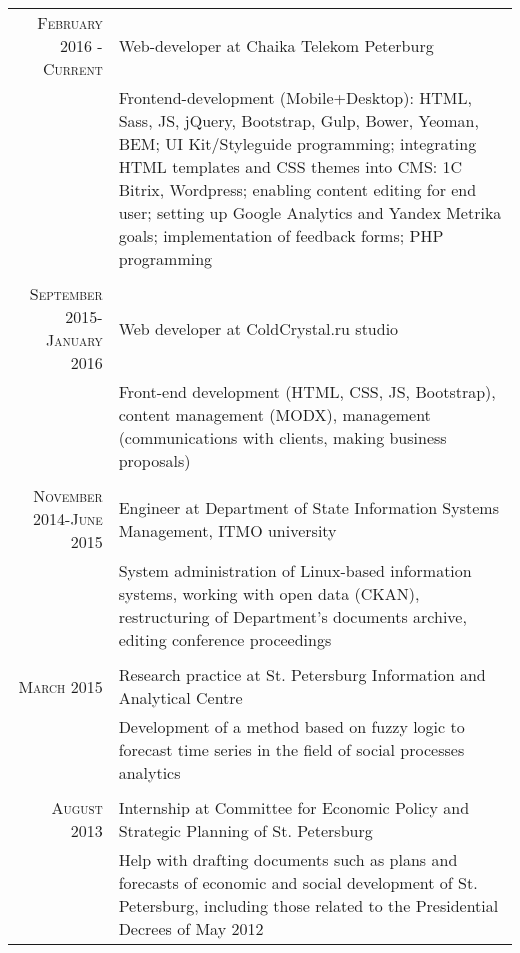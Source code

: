 \documentclass[a4paper,10pt]{article} %
\begin{document}
\begin{tabular}{r|p{11cm}}
    \textsc{February 2016 - Current} & Web-developer at Chaika Telekom Peterburg\\
    & \footnotesize{Frontend-development (Mobile+Desktop): HTML, Sass, JS, jQuery,
        Bootstrap, Gulp, Bower, Yeoman, BEM; UI Kit/Styleguide programming; 
        integrating HTML templates and CSS themes \protect\linebreak into CMS: 1C Bitrix, Wordpress; 
        enabling content editing for end user; setting up Google Analytics and
        Yandex Metrika goals; implementation of feedback forms; PHP programming}\\
\multicolumn{2}{c}{} \\
    \textsc{September 2015-January 2016} & Web developer at ColdCrystal.ru studio \\
    & \footnotesize{Front-end development (HTML, CSS, JS, Bootstrap), content
management (MODX), management (communications with clients, making business
proposals)}\\
\multicolumn{2}{c}{} \\
    \textsc{November 2014-June 2015} & Engineer at Department of State
Information Systems Management, \protect\linebreak ITMO university \\
    & \footnotesize{System administration of Linux-based information systems,
        working with open data (CKAN), restructuring of Department's documents archive,
        editing conference proceedings}\\
\multicolumn{2}{c}{} \\
\textsc{March 2015} & Research practice at St. Petersburg Information and Analytical Centre \\
                    & \footnotesize{Development of a method based on fuzzy logic to forecast time series in the field of social processes analytics }\\
\multicolumn{2}{c}{} \\


\textsc{August 2013} & Internship at Committee for Economic Policy and Strategic
Planning \protect\linebreak of St. Petersburg \\
& \footnotesize{ Help with drafting documents such as plans and forecasts of
economic and social development \protect\linebreak of St. Petersburg, including those related to
the Presidential Decrees of May 2012 }
\end{tabular}
\end{document}
